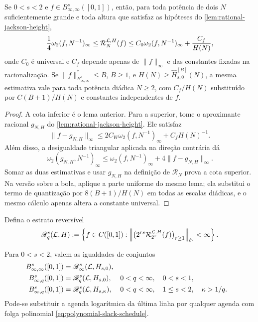 \begin{theorem}
\label{thm:regularized-jackson-bernstein}
Se $0<s<2$ e $f\in B^s_{\infty,\infty}([0,1])$, então, para toda potência de
dois $N$ suficientemente grande e toda altura que satisfaz as hipóteses do
\cref{lem:rational-jackson-height},
\begin{equation}
 \frac14\omega_2(f,N^{-1})_\infty
 \le \mathcal R_N^{\mathcal{L},H}(f)
 \le C_0\omega_2(f,N^{-1})_\infty+\frac{C_f}{H(N)},
 \label{eq:two-sided-regularized-equivalence}
\end{equation}
onde $C_0$ é universal e $C_f$ depende apenas de $\|f\|_\infty$ e das
constantes fixadas na racionalização.
Se $\|f\|_{B^s_{\infty,\infty}}^*\le B$, $B\ge1$, e
$H(N)\ge\widehat H_{s,0}^{[B]}(N)$, a mesma estimativa vale para toda potência
diádica $N\ge2$, com $C_f/H(N)$ substituído por $C(B+1)/H(N)$ e constantes
independentes de $f$.
\end{theorem}

\begin{proof}
A cota inferior é o lema anterior. Para a superior, tome o aproximante
racional $g_{N,H}$ do \cref{lem:rational-jackson-height}. Ele satisfaz
\[
 \|f-g_{N,H}\|_\infty
 \le2C_W\omega_2(f,N^{-1})_\infty+C_fH(N)^{-1}.
\]
Além disso, a desigualdade triangular aplicada na direção contrária dá
\[
 \omega_2(g_{N,H},N^{-1})_\infty
 \le\omega_2(f,N^{-1})_\infty+4\|f-g_{N,H}\|_\infty.
\]
Somar as duas estimativas e usar $g_{N,H}$ na definição de
$\mathcal R_N$ prova a cota superior. Na versão sobre a bola, aplique a parte
uniforme do mesmo lema; ela substitui o termo de quantização por
$8(B+1)/H(N)$ em todas as escalas diádicas, e o mesmo cálculo apenas altera a
constante universal.
\end{proof}

Defina o estrato reversível
\begin{equation}
 \mathscr R_q^s(\mathcal{L},H)
 :=\left\{f\in C([0,1]):
 \left\|\bigl(2^{rs}\mathcal R_{2^r}^{\mathcal{L},H}(f)\bigr)_{r\ge1}
 \right\|_{\ell^q}<\infty\right\}.
 \label{eq:reversible-stratum}
\end{equation}

\begin{theorem}
\label{thm:complete-besov-reversibility}
Para $0<s<2$, valem as igualdades de conjuntos
\begin{align}
 B^s_{\infty,\infty}([0,1])
 &=\mathscr R_\infty^s(\mathcal{L},H_{s,0}),
 \label{eq:complete-reverse-endpoint}\\
 B^s_{\infty,q}([0,1])
 &=\mathscr R_q^s(\mathcal{L},H_{s,0}),
 &&0<q<\infty,\quad0<s<1,
 \label{eq:complete-reverse-subcritical}\\
 B^s_{\infty,q}([0,1])
 &=\mathscr R_q^s(\mathcal{L},H_{s,\kappa}),
 &&0<q<\infty,\quad1\le s<2,\quad\kappa>1/q.
 \label{eq:complete-reverse-critical}
\end{align}
Pode-se substituir a agenda logarítmica da última linha por qualquer agenda
com folga polinomial \eqref{eq:polynomial-slack-schedule}.
\end{theorem}


